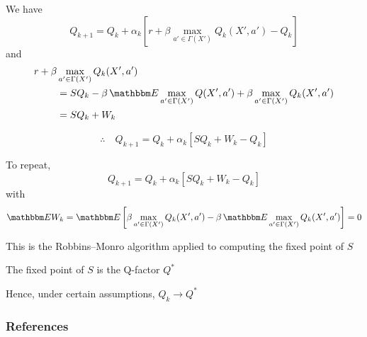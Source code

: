 \documentclass[xcolor=dvipsnames]{beamer}  %
\newcommand{\fore}{\therefore \quad}
\newcommand{\1}{\mathbbm 1}
\newcommand{\EE}{\mathbbm E}
\begin{document}
\begin{frame}

    We have
    \begin{equation*}
        Q_{k+1} 
        = Q_k + \alpha_k 
        \left[
            r + \beta \max_{a' \in \Gamma(X')} Q_k(X', a')
            - Q_k
        \right]
    \end{equation*}
    and
    \begin{align*}
        r + \beta & \max_{a' \in \Gamma(X')} Q_k(X', a')
        \\
          & = S Q_k - \beta \, \EE \max_{a' \in \Gamma(X')} Q(X',a') + \beta \max_{a' \in \Gamma(X')} Q_k(X', a')
        \\
          & = S Q_k + W_k
    \end{align*}

    \begin{equation*}
        \fore
        Q_{k+1} 
        = Q_k + \alpha_k 
        \left[
            S Q_k + W_k - Q_k
        \right]
    \end{equation*}

\end{frame}

\begin{frame}
    
    To repeat,
    \begin{equation*}
        Q_{k+1} 
        = Q_k + \alpha_k 
        \left[
            S Q_k + W_k - Q_k
        \right]
    \end{equation*}
    with
    \begin{equation*}
        \EE W_k 
        = \EE 
        \left[ 
            \beta \max_{a' \in \Gamma(X')} Q_k(X', a') 
            - \beta \, \EE \max_{a' \in \Gamma(X')} Q_k(X', a')
        \right] = 0
    \end{equation*}

    This is the Robbins--Monro algorithm applied to computing the fixed point
    of $S$

    The fixed point of $S$ is the Q-factor $Q^*$

    Hence, under certain assumptions, $Q_k \to Q^*$

\end{frame}

\begin{frame}[allowframebreaks]
    \frametitle{References}

    

    

\end{frame}
\end{document}

